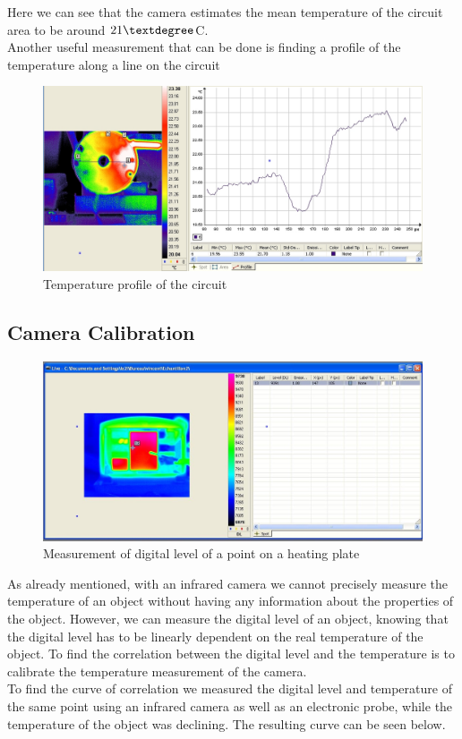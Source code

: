 \documentclass[english]{article}
\begin{document}
Here we can see that the camera estimates the mean temperature of the circuit area to be around $21 \textdegree$C.\\
Another useful measurement that can be done is finding a profile of the temperature along a line on the circuit\\
\begin{figure}[H]
	\centering
	\includegraphics[width=1\linewidth]{Pictures/profile.jpg}
	\caption{Temperature profile of the circuit}
	\label{fig}
\end{figure}


\subsection{Camera Calibration}
\begin{figure}[H]
	\centering
	\includegraphics[width=1\linewidth]{Pictures/calib.JPG}
	\caption{Measurement of digital level of a point on a heating plate}
	\label{fig:four}
\end{figure}
As already mentioned, with an infrared camera we cannot precisely measure the temperature of an object without having any information about the properties of the object.
However, we can measure the digital level of an object, knowing that the digital level has to be linearly dependent on the real temperature of the object.
To find the correlation between the digital level and the temperature is to calibrate the temperature measurement of the camera.\\
To find the curve of correlation we measured the digital level and temperature of the same point using an infrared camera as well as an electronic probe, while the temperature of the object was declining.
The resulting curve can be seen below.\\
\end{document}

